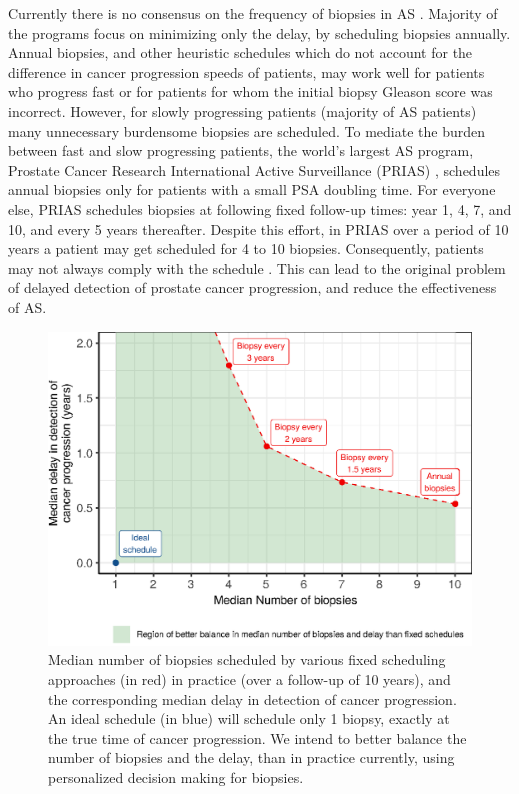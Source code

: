 Currently there is no consensus on the frequency of biopsies in AS \cite{loeb2014heterogeneity}. Majority of the programs focus on minimizing only the delay, by scheduling biopsies annually. Annual biopsies, and other heuristic schedules\cite{inoue2018comparative} which do not account for the difference in cancer progression speeds of patients, may work well for patients who progress fast or for patients for whom the initial biopsy Gleason score was incorrect. However, for slowly progressing patients (majority of AS patients) many unnecessary burdensome biopsies are scheduled. To mediate the burden between fast and slow progressing patients, the world's largest AS program, Prostate Cancer Research International Active Surveillance (PRIAS) \cite{bul2013active}, schedules annual biopsies only for patients with a small PSA doubling time\cite{bokhorst2015compliance}. For everyone else, PRIAS schedules biopsies at following fixed follow-up times: year 1, 4, 7, and 10, and every 5 years thereafter. Despite this effort, in PRIAS over a period of 10 years a patient may get scheduled for 4 to 10 biopsies. Consequently, patients may not always comply with the schedule \cite{bokhorst2015compliance}. This can lead to the original problem of delayed detection of prostate cancer progression, and reduce the effectiveness of AS.
 
\begin{figure}[!htb]
\captionsetup{justification=justified}
\centerline{\includegraphics[width=\columnwidth]{images/better_balance_intro.eps}}
\caption{Median number of biopsies scheduled by various fixed scheduling approaches (in red) in practice (over a follow-up of 10 years), and the corresponding median delay in detection of cancer progression. An ideal schedule (in blue) will schedule only 1 biopsy, exactly at the true time of cancer progression. We intend to better balance the number of biopsies and the delay, than in practice currently, using personalized decision making for biopsies.}
\label{fig:better_balance_intro}
\end{figure}

